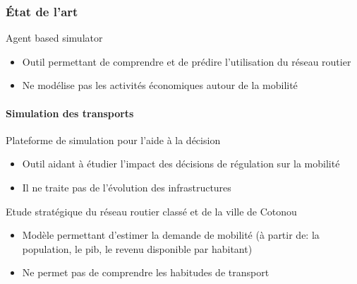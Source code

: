 %

\begin{frame}
    \frametitle{État de l'art}
        \begin{block}{Agent based simulator~\parencite{zargayouna2013agent}}
        \begin{itemize}
            \item {} Outil permettant de comprendre et de prédire l'utilisation du réseau routier
            \item {} Ne modélise pas les activités économiques autour de la mobilité
        \end{itemize}
    \end{block}
    \framesubtitle{Simulation des transports}
    \begin{block}{Plateforme de simulation pour l'aide à la décision~\parencite{nguyen2015plate}}
        \begin{itemize}
            \item {} Outil aidant à étudier l'impact des décisions de régulation sur la mobilité
            \item {} Il ne traite pas de l'évolution des infrastructures
        \end{itemize}
    \end{block}
    \begin{block}{Etude stratégique du réseau routier classé et de la ville de Cotonou~\parencite{louisberger2017etudes}}
        \begin{itemize}
            \item {} Modèle permettant d'estimer la demande de mobilité (à partir de: la population, le pib, le revenu disponible par habitant)
            \item {} Ne permet pas de comprendre les habitudes de transport
        \end{itemize}
    \end{block}
\end{frame}

